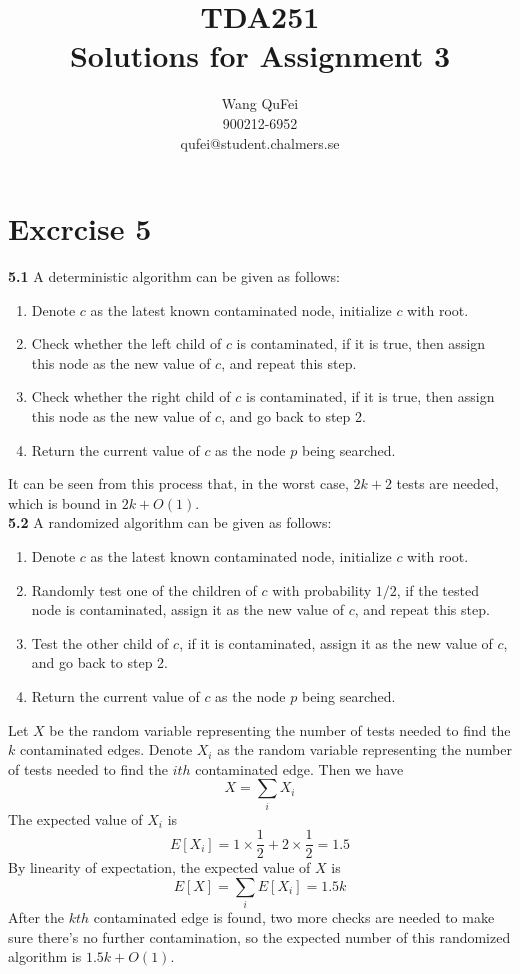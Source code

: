 \documentclass[10pt]{article}
\title{TDA251\\Solutions for Assignment 3}
\author{Wang QuFei\\900212-6952\\qufei@student.chalmers.se}
\begin{document}
\maketitle
\section*{Excrcise 5}
\textbf{5.1} A deterministic algorithm can be given as follows:
\begin{enumerate}
	\item Denote $c$ as the latest known contaminated node, initialize $c$ with root.
	\item Check whether the left child of $c$ is contaminated, if it is true, then assign this node as the new value of $c$, and repeat this step.
	\item Check whether the right child of $c$ is contaminated, if it is true, then assign this node as the new value of $c$, and go back to step 2.
	\item Return the current value of $c$ as the node $p$ being searched.
\end{enumerate}
It can be seen from this process that, in the worst case, $2k + 2$ tests are needed, which is bound in $2k + O(1)$.\\
\textbf{5.2} A randomized algorithm can be given as follows:
\begin{enumerate}
	\item Denote $c$ as the latest known contaminated node, initialize $c$ with root.
	\item Randomly test one of the children of $c$ with probability $1/2$, if the tested node is contaminated, assign it as the new value of $c$, and repeat this step.
	\item Test the other child of $c$, if it is contaminated, assign it as the new value of $c$, and go back to step 2.
	\item Return the current value of $c$ as the node $p$ being searched.
\end{enumerate}
Let $X$ be the random variable representing the number of tests needed to find the $k$ contaminated edges. Denote $X_{i}$ as the random variable representing the number of tests needed to find the $ith$ contaminated edge. Then we have
	\[X = \sum_{i}X_{i}\]
The expected value of $X_i$ is
	\[E[X_i] = 1 \times \frac{1}{2} + 2 \times \frac{1}{2} = 1.5\]
By linearity of expectation, the expected value of $X$ is
	\[E[X] = \sum_{i}E[X_i] = 1.5k\]
After the $kth$ contaminated edge is found, two more checks are needed to make sure there's no further contamination, so the expected number of this randomized algorithm is $1.5k + O(1)$.\\
\end{document}
